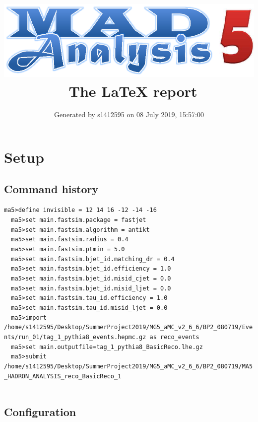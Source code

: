\documentclass[a4paper, 10pt]{article}
\title{{\includegraphics[scale=.4]{logo.eps}}\ The LaTeX report}
\author{Generated by s1412595 on 08 July 2019, 15:57:00}
\begin{document}
\maketitle
\flushbottom

\newpage
\section{ Setup}

\subsection{ Command history}

\texttt{ma5>define invisible = 12 14 16 -12 -14 -16\\
}
\texttt{ }\texttt{ }\texttt{ma5>set main.fastsim.package = fastjet\\
}
\texttt{ }\texttt{ }\texttt{ma5>set main.fastsim.algorithm = antikt\\
}
\texttt{ }\texttt{ }\texttt{ma5>set main.fastsim.radius = 0.4\\
}
\texttt{ }\texttt{ }\texttt{ma5>set main.fastsim.ptmin = 5.0\\
}
\texttt{ }\texttt{ }\texttt{ma5>set main.fastsim.bjet\_id.matching\_dr = 0.4\\
}
\texttt{ }\texttt{ }\texttt{ma5>set main.fastsim.bjet\_id.efficiency = 1.0\\
}
\texttt{ }\texttt{ }\texttt{ma5>set main.fastsim.bjet\_id.misid\_cjet = 0.0\\
}
\texttt{ }\texttt{ }\texttt{ma5>set main.fastsim.bjet\_id.misid\_ljet = 0.0\\
}
\texttt{ }\texttt{ }\texttt{ma5>set main.fastsim.tau\_id.efficiency = 1.0\\
}
\texttt{ }\texttt{ }\texttt{ma5>set main.fastsim.tau\_id.misid\_ljet = 0.0\\
}
\texttt{ }\texttt{ }\texttt{ma5>import /\-home/\-s1412595/\-Desktop/\-SummerProject2019/\-MG5\_aMC\_v2\_6\_6/\-BP2\_080719/\-Events/\-run\_01/\-tag\_1\_pythia8\_events.hepmc.gz as reco\_events\\
}
\texttt{ }\texttt{ }\texttt{ma5>set main.outputfile=tag\_1\_pythia8\_BasicReco.lhe.gz\\
}
\texttt{ }\texttt{ }\texttt{ma5>submit /\-home/\-s1412595/\-Desktop/\-SummerProject2019/\-MG5\_aMC\_v2\_6\_6/\-BP2\_080719/\-MA5\_HADRON\_ANALYSIS\_reco\_BasicReco\_1\\
}
\texttt{ }\texttt{ }\subsection{ Configuration}
\end{document}
